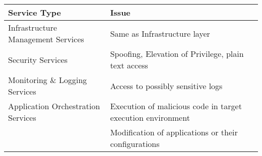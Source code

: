 \begin{tabularx}{0.7\linewidth}{
    | p{15em}
    | >{\raggedright\arraybackslash}X
    |
  }
  \hline
  Service Type                       & Issue                                                       \\
  \hline
  \hline
  Infrastructure Management Services & Same as Infrastructure layer                                \\
  \hline
  Security Services                  & Spoofing, Elevation of Privilege, plain text access         \\
  \hline
  Monitoring \& Logging Services     & Access to possibly sensitive logs                           \\
  \hline
  Application Orchestration Services & Execution of malicious code in target execution environment \\
  \cline{2-2}
                                     & Modification of applications or their configurations        \\
  \hline
\end{tabularx}
